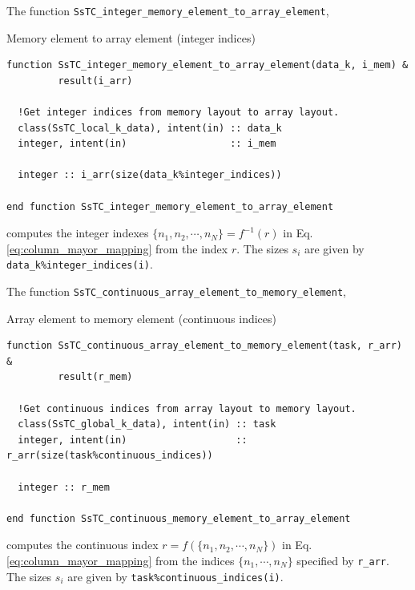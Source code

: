 \documentclass[10pt,a4paper]{article}
\begin{document}
The function \verb|SsTC_integer_memory_element_to_array_element|,
\begin{codebox}{Memory element to array element (integer indices)}
\begin{lstlisting}[caption={Interface of ``integer memory element to array element".},captionpos=b]
function SsTC_integer_memory_element_to_array_element(data_k, i_mem) &
         result(i_arr)

  !Get integer indices from memory layout to array layout.
  class(SsTC_local_k_data), intent(in) :: data_k
  integer, intent(in)                  :: i_mem

  integer :: i_arr(size(data_k%integer_indices))

end function SsTC_integer_memory_element_to_array_element
\end{lstlisting}
\end{codebox}
computes the integer indexes $\{n_1, n_2, \cdots, n_N\} = f^{-1}(r)$ in Eq. \eqref{eq:column_mayor_mapping} from the index $r$. The sizes $s_i$ are given by \verb|data_k%integer_indices(i)|.

The function \verb|SsTC_continuous_array_element_to_memory_element|,
\begin{codebox}{Array element to memory element (continuous indices)}
\begin{lstlisting}[caption={Interface of ``continuous array element to memory element".},captionpos=b]
function SsTC_continuous_array_element_to_memory_element(task, r_arr) &
         result(r_mem)

  !Get continuous indices from array layout to memory layout.
  class(SsTC_global_k_data), intent(in) :: task
  integer, intent(in)                   :: r_arr(size(task%continuous_indices))

  integer :: r_mem

end function SsTC_continuous_memory_element_to_array_element
\end{lstlisting}
\end{codebox}
computes the continuous index $r = f(\{n_1, n_2, \cdots, n_N\})$ in Eq. \eqref{eq:column_mayor_mapping} from the indices $\{n_1, \cdots, n_N\}$ specified by \verb|r_arr|. The sizes $s_i$ are given by \verb|task%continuous_indices(i)|.
\end{document}
